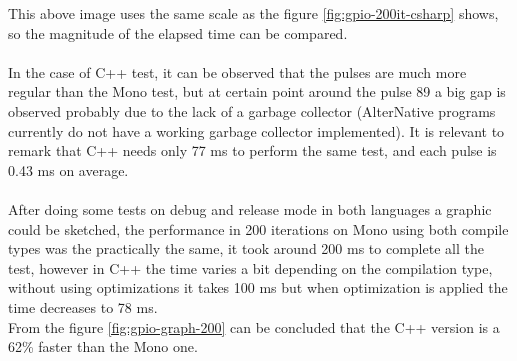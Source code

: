 This above image uses the same scale as the figure \ref{fig:gpio-200it-csharp} shows, so the magnitude of the elapsed time can be compared.
\\
\\
In the case of C++ test, it can be observed that the pulses are much more regular than the Mono test, but at certain point around the pulse 89 a big gap is observed probably due to the lack of a garbage collector (AlterNative programs currently do not have a working garbage collector implemented). It is relevant to remark that C++ needs only 77 ms to perform the same test, and each pulse is 0.43 ms on average.
\\
\\
After doing some tests on debug and release mode in both languages a graphic could be sketched, the performance in 200 iterations on Mono using both compile types was the practically the same, it took around 200 ms to complete all the test, however in C++ the time varies a bit depending on the compilation type, without using optimizations it takes 100 ms but when optimization is applied the time decreases to 78 ms.
\\
From the figure \ref{fig:gpio-graph-200} can be concluded that the C++ version is a 62\% faster than the Mono one.
